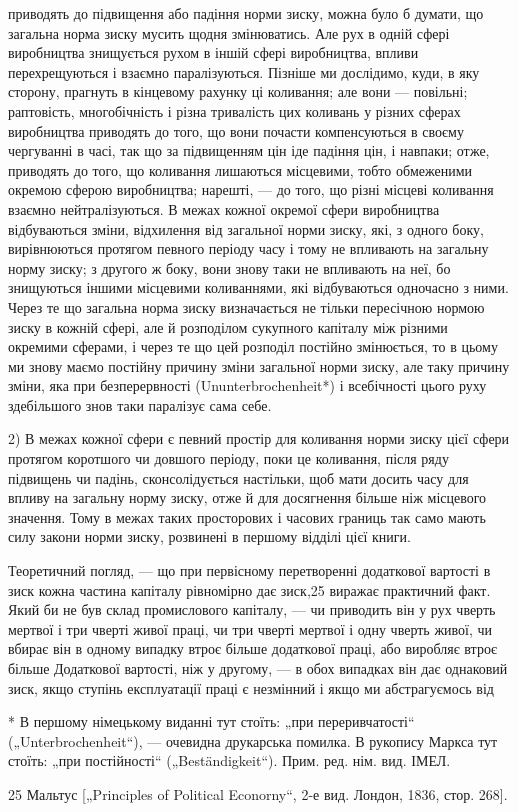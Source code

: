 приводять до підвищення або падіння норми зиску, можна було б думати, що загальна норма зиску мусить
щодня змінюватись. Але рух в одній сфері виробництва знищується рухом в іншій сфері виробництва,
впливи перехрещуються і взаємно
паралізуються. Пізніше ми дослідимо, куди, в яку сторону, прагнуть в кінцевому рахунку ці коливання;
але вони — повільні;
раптовість, многобічність і різна тривалість цих коливань у
різних сферах виробництва приводять до того, що вони почасти компенсуються в своєму чергуванні в
часі, так що за
підвищенням цін іде падіння цін, і навпаки; отже, приводять до того, що коливання лишаються
місцевими, тобто обмеженими окремою сферою виробництва; нарешті, — до того, що різні місцеві
коливання взаємно нейтралізуються. В межах кожної окремої сфери виробництва відбуваються зміни,
відхилення
від загальної норми зиску, які, з одного боку, вирівнюються
протягом певного періоду часу і тому не впливають на загальну
норму зиску; з другого ж боку, вони знову таки не впливають
на неї, бо знищуються іншими місцевими коливаннями, які відбуваються одночасно з ними. Через те що
загальна норма зиску
визначається не тільки пересічною нормою зиску в кожній сфері,
але й розподілом сукупного капіталу між різними окремими
сферами, і через те що цей розподіл постійно змінюється, то
в цьому ми знову маємо постійну причину зміни загальної норми
зиску, але таку причину зміни, яка при безперервності (Ununterbrochenheit*) і всебічності цього руху
здебільшого знов таки
паралізує сама себе.

2) В межах кожної сфери є певний простір для коливання
норми зиску цієї сфери протягом коротшого чи довшого періоду, поки це коливання, після ряду
підвищень чи падінь,
сконсолідується настільки, щоб мати досить часу для впливу
на загальну норму зиску, отже й для досягнення більше ніж
місцевого значення. Тому в межах таких просторових і часових границь так само мають силу закони
норми зиску, розвинені в першому відділі цієї книги.

Теоретичний погляд, — що при первісному перетворенні додаткової вартості в зиск кожна частина
капіталу рівномірно
дає зиск,25 виражає практичний факт. Який би не був склад промислового капіталу, — чи приводить він
у рух чверть мертвої
і три чверті живої праці, чи три чверті мертвої і одну чверть
живої, чи вбирає він в одному випадку втроє більше додаткової
праці, або виробляє втроє більше Додаткової вартості, ніж у другому, — в обох випадках він дає
однаковий зиск, якщо ступінь
експлуатації праці є незмінний і якщо ми абстрагуємось від

* В першому німецькому виданні тут стоїть: „при переривчатості“ („Unterbrochenheit“), — очевидна
друкарська помилка. В рукопису Маркса тут стоїть:
„при постійності“ („Beständigkeit“). Прим. ред. нім. вид. ІМЕЛ.

25 Мальтус [„Principles of Political Econorny“, 2-е вид. Лондон, 1836, стор. 268].
